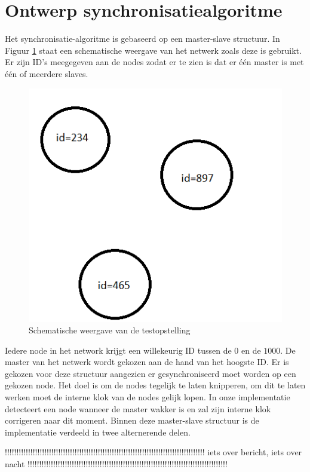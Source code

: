 \documentclass{article}
\begin{document}
\section{Ontwerp synchronisatiealgoritme}
Het synchronisatie-algoritme is gebaseerd op een master-slave structuur. In Figuur \ref{fig: Schematisch} staat een schematische weergave van het netwerk zoals deze is gebruikt. Er zijn ID's meegegeven aan de nodes zodat er te zien is dat er \'{e}\'{e}n master is met \'{e}\'{e}n of meerdere slaves. 
\begin{figure}[h]
\centering\includegraphics[scale=0.5]{testopstelling}
\caption{Schematische weergave van de testopstelling}
\label{fig: Schematisch}
\end{figure}
Iedere node in het network krijgt een willekeurig ID tussen de $0$ en de $1000$. De master van het netwerk wordt gekozen aan de hand van het hoogste ID. Er is gekozen voor deze structuur aangezien er gesynchroniseerd moet worden op een gekozen node. Het doel is om de nodes tegelijk te laten knipperen, om dit te laten werken moet de interne klok van de nodes gelijk lopen. In onze implementatie detecteert een node wanneer de master wakker is en zal zijn interne klok corrigeren naar dit moment. Binnen deze master-slave structuur is de implementatie verdeeld in twee alternerende delen.

!!!!!!!!!!!!!!!!!!!!!!!!!!!!!!!!!!!!!!!!!!!!!!!!!!!!!!!!!!!!!!!!!!!!!!!!!!!!!!!!!!!!!!
iets over bericht, iets over nacht
!!!!!!!!!!!!!!!!!!!!!!!!!!!!!!!!!!!!!!!!!!!!!!!!!!!!!!!!!!!!!!!!!!!!!!!!!!!!!!!!!!!!!!
\end{document}
